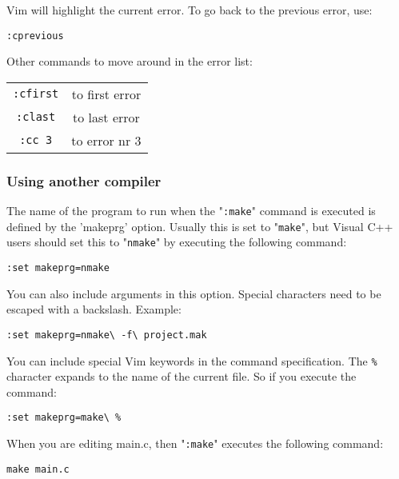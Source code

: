 Vim will highlight the current error.
To go back to the previous error, use:

\begin{Verbatim}[samepage=true]
 :cprevious
\end{Verbatim}

Other commands to move around in the error list:

\begin{center} \begin{tabular}{c c}
				\verb!:cfirst! & to first error \\
				\verb!:clast! & to last error \\
				\verb!:cc 3! & to error nr 3 \\
\end{tabular} \end{center}

\subsubsection{Using another compiler}
The name of the program to run when the "\verb!:make!" command is executed is defined by the 'makeprg' option.
Usually this is set to "\verb!make!", but Visual C++ users should set this to "\verb!nmake!" by executing the following command:

\begin{Verbatim}[samepage=true]
 :set makeprg=nmake
\end{Verbatim}

You can also include arguments in this option.
Special characters need to be escaped with a backslash.
Example:

\begin{Verbatim}[samepage=true]
 :set makeprg=nmake\ -f\ project.mak
\end{Verbatim}

You can include special Vim keywords in the command specification.
The \verb!%! character expands to the name of the current file.
So if you execute the command:

\begin{Verbatim}[samepage=true]
 :set makeprg=make\ %
\end{Verbatim}

When you are editing main.c, then "\verb!:make!" executes the following command:

\begin{Verbatim}[samepage=true]
 make main.c
\end{Verbatim}

